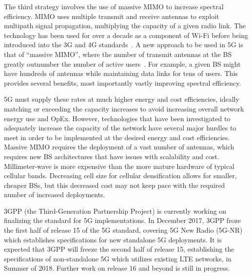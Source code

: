 \documentclass[12pt,dvipsnames]{report}
\begin{document}

The third strategy involves the use of massive MIMO to increase spectral efficiency.  MIMO uses multiple transmit and receive antennas to exploit multipath signal propagation, multiplying the capacity of a given radio link.  The technology has been used for over a decade as a component of Wi-Fi before being introduced into the 3G and 4G standards~\cite{6824752}.  A new approach to be used in 5G is that of ``massive MIMO'', where the number of transmit antennas at the BS greatly outnumber the number of active users~\cite{5595728}.  For example, a given BS might have hundreds of antennas while maintaining data links for tens of users.  This provides several benefits, most importantly vastly improving spectral efficiency.

5G must supply these rates at much higher energy and cost efficiencies, ideally matching or exceeding the capacity increases to avoid increasing overall network energy use and OpEx.  However, technologies that have been investigated to adequately increase the capacity of the network have several major hurdles to meet in order to be implemented at the desired energy and cost efficiencies.  Massive MIMO requires the deployment of a vast number of antennas, which requires new BS architectures that have issues with scalability and cost.  Millimeter-wave is more expensive than the more mature hardware of typical cellular bands.  Decreasing cell size for cellular densification allows for smaller, cheaper BSs, but this decreased cost may not keep pace with the required number of increased deployments.~\cite{6824752}

3GPP (the Third-Generation Partnership Project) is currently working on finalizing the standard for 5G implementations.  In December 2017, 3GPP froze the first half of release 15 of the 5G standard, covering 5G New Radio (5G-NR) which establishes specifications for new standalone 5G deployments.  It is expected that 3GPP will freeze the second half of release 15, establishing the specifications of non-standalone 5G which utilizes existing LTE networks, in Summer of 2018.  Further work on release 16 and beyond is still in progress.
\end{document}

